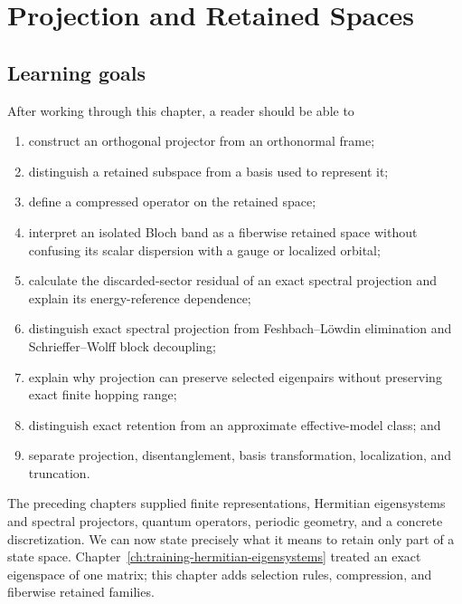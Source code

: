 \chapter{Projection and Retained Spaces}

\label{ch:training-projection-retained-spaces}


\section{Learning goals}

After working through this chapter, a reader should be able to

\begin{enumerate}
  \item construct an orthogonal projector from an orthonormal frame;
  \item distinguish a retained subspace from a basis used to represent it;
  \item define a compressed operator on the retained space;
  \item interpret an isolated Bloch band as a fiberwise retained space without
        confusing its scalar dispersion with a gauge or localized orbital;
  \item calculate the discarded-sector residual of an exact spectral
        projection and explain its energy-reference dependence;
  \item distinguish exact spectral projection from Feshbach--L\"owdin
        elimination and Schrieffer--Wolff block decoupling;
  \item explain why projection can preserve selected eigenpairs without
        preserving exact finite hopping range;
  \item distinguish exact retention from an approximate effective-model class;
        and
  \item separate projection, disentanglement, basis transformation,
        localization, and truncation.
\end{enumerate}

The preceding chapters supplied finite representations, Hermitian eigensystems
and spectral projectors, quantum operators, periodic geometry, and a concrete
discretization. We can now state precisely what it means to retain only part of
a state space. Chapter~\ref{ch:training-hermitian-eigensystems} treated an
exact eigenspace of one matrix; this chapter adds selection rules, compression,
and fiberwise retained families.

